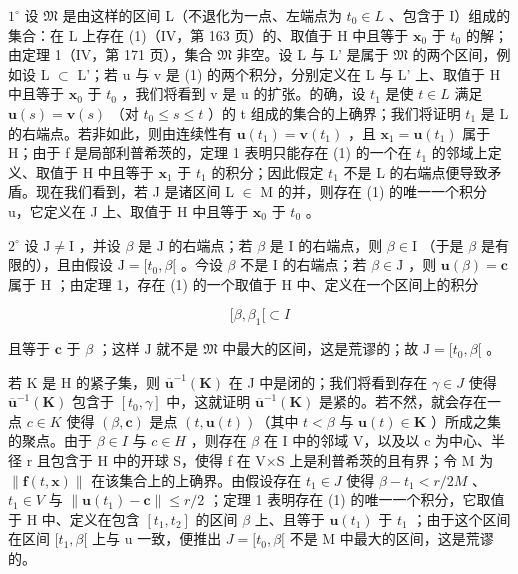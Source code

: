 \(1^{\circ}\) 设 \(\mathfrak{M}\) 是由这样的区间 L（不退化为一点、左端点为 \(t_0 \in L\) 、包含于 I）组成的集合：在 L 上存在 (1)（IV，第 163 页）的、取值于 H 中且等于 \(\mathbf{x}_0\) 于 \(t_0\) 的解；由定理 1（IV，第 171 页），集合 \(\mathfrak{M}\) 非空。设 L 与 L' 是属于 \(\mathfrak{M}\) 的两个区间，例如设 L \(\subset\) L'；若 u 与 v 是 (1) 的两个积分，分别定义在 L 与 L' 上、取值于 H 中且等于 \(\mathbf{x}_0\) 于 \(t_0\) ，我们将看到 v 是 u 的扩张。的确，设 \(t_1\) 是使 \(t \in L\) 满足 \(\mathbf{u}(s) = \mathbf{v}(s)\) （对 \(t_0 \leqslant s \leqslant t\) ）的 t 组成的集合的上确界；我们将证明 \(t_1\) 是 L 的右端点。若非如此，则由连续性有 \(\mathbf{u}(t_1) = \mathbf{v}(t_1)\) ，且 \(\mathbf{x}_1 = \mathbf{u}(t_1)\) 属于 H；由于 f 是局部利普希茨的，定理 1 表明只能存在 (1) 的一个在 \(t_1\) 的邻域上定义、取值于 H 中且等于 \(\mathbf{x}_1\) 于 \(t_1\) 的积分；因此假定 \(t_1\) 不是 L 的右端点便导致矛盾。现在我们看到，若 J 是诸区间 L \(\in\) M 的并，则存在 (1) 的唯一一个积分 u，它定义在 J 上、取值于 H 中且等于 \(\mathbf{x}_0\) 于 \(t_0\) 。

\(2^{\circ}\) 设 \(\mathrm{J} \neq \mathrm{I}\) ，并设 \(\beta\) 是 \(\mathrm{J}\) 的右端点；若 \(\beta\) 是 \(\mathrm{I}\) 的右端点，则 \(\beta \in \mathrm{I}\) （于是 \(\beta\) 是有限的），且由假设 \(\mathrm{J} = [t_0, \beta[\) 。今设 \(\beta\) 不是 \(\mathrm{I}\) 的右端点；若 \(\beta \in \mathrm{J}\) ，则 \(\mathbf{u}(\beta) = \mathbf{c}\) 属于 \(\mathrm{H}\) ；由定理 1，存在 (1) 的一个取值于 \(\mathrm{H}\) 中、定义在一个区间上的积分

\[
[ \beta , \beta_ {1} [ \subset I
\]

且等于 \(\mathbf{c}\) 于 \(\beta\) ；这样 \(\mathrm{J}\) 就不是 \(\mathfrak{M}\) 中最大的区间，这是荒谬的；故 \(\mathrm{J} = [t_0, \beta[\) 。

若 K 是 H 的紧子集，则 \(\overline{\mathbf{u}}^{-1}(\mathbf{K})\) 在 J 中是闭的；我们将看到存在 \(\gamma\in J\) 使得 \(\overline{\mathbf{u}}^{-1}(\mathbf{K})\) 包含于 \([t_{0},\gamma]\) 中，这就证明 \(\overline{\mathbf{u}}^{-1}(\mathbf{K})\) 是紧的。若不然，就会存在一点 \(c\in K\) 使得 \((\beta,\mathbf{c})\) 是点 \((t,\mathbf{u}(t))\)（其中 \(t<\beta\) 与 \(\mathbf{u}(t)\in\mathbf{K}\) ）所成之集的聚点。由于 \(\beta\in I\) 与 \(c\in H\) ，则存在 \(\beta\) 在 I 中的邻域 V，以及以 c 为中心、半径 r 且包含于 H 中的开球 S，使得 f 在 V×S 上是利普希茨的且有界；令 M 为 \(\|\mathbf{f}(t,\mathbf{x})\|\) 在该集合上的上确界。由假设存在 \(t_{1}\in J\) 使得 \(\beta-t_{1}<r/2M\) 、\(t_{1}\in V\) 与 \(\|\mathbf{u}(t_{1})-\mathbf{c}\|\leqslant r/2\) ；定理 1 表明存在 (1) 的唯一一个积分，它取值于 H 中、定义在包含 \([t_{1},t_{2}]\) 的区间 \(\beta\) 上、且等于 \(\mathbf{u}(t_{1})\) 于 \(t_{1}\) ；由于这个区间在区间 \([t_{1},\beta[\) 上与 u 一致，便推出 \(J=[t_{0},\beta[\) 不是 M 中最大的区间，这是荒谬的。

